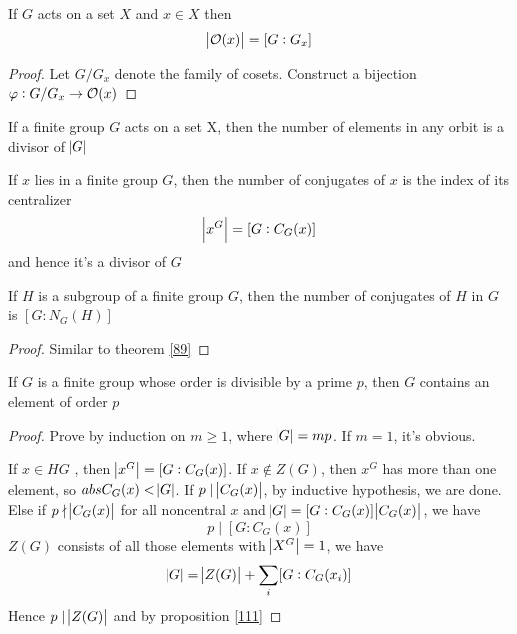 \documentclass[11pt]{article}
\begin{document}
\begin{theorem}[]
\label{89}
If \(G\) acts on a set \(X\) and \(x\in X\) then
\begin{equation*}
\abs{\mathcal{O}(x)}=[G:G_x]
\end{equation*}
\end{theorem}

\begin{proof}
Let \(G/G_x\) denote the family of cosets. Construct a bijection
\(\varphi:G/G_x\to \mathcal{O}(x)\)
\end{proof}

\begin{corollary}[]
If a finite group \(G\) acts on a set X, then the number of elements in any
orbit is a divisor of \(\abs{G}\)
\end{corollary}

\begin{corollary}[]
If \(x\) lies in a finite group \(G\), then the number of conjugates of \(x\) is
the index of its centralizer
\begin{equation*}
\abs{x^G}=[G:C_G(x)]
\end{equation*}
and hence it's a divisor of \(G\)
\end{corollary}

\begin{proposition}[]
If \(H\) is a subgroup of a finite group \(G\), then the number of conjugates of
\(H\) in \(G\) is \([G:N_G(H)]\)
\end{proposition}

\begin{proof}
Similar to theorem \ref{89}
\end{proof}

\begin{theorem}[Cauchy]
If \(G\) is a finite group whose order is divisible by a prime \(p\), then \(G\)
contains an element of order \(p\)
\end{theorem}

\begin{proof}
Prove by induction on \(m\ge 1\), where \(\abs{G}=mp\). If \(m=1\), it's obvious.

If \(x\in HG\) , then \(\abs{x^G}=[G:C_G(x)]\). If \(x\not\in Z(G)\), then \(x^G\)
has more than one element, so \(abs{C_G(x)}<\abs{G}\). If \(p\mid \abs{C_G(x)}\), by
inductive hypothesis, we are done. Else if \(p\nmid \abs{C_G(x)}\) for all
noncentral \(x\) and \(\abs{G}=[G:C_G(x)]\abs{C_G(x)}\), we have
\begin{equation*}
p\mid[G:C_G(x)]
\end{equation*}
\(Z(G)\) consists of all those elements with \(\abs{X^G}=1\), we have
\begin{equation*}
\abs{G}=\abs{Z(G)}+\displaystyle\sum_i[G:C_G(x_i)]
\end{equation*}
Hence \(p\mid\abs{Z(G)}\) and by proposition \ref{111}
\end{proof}
\end{document}
